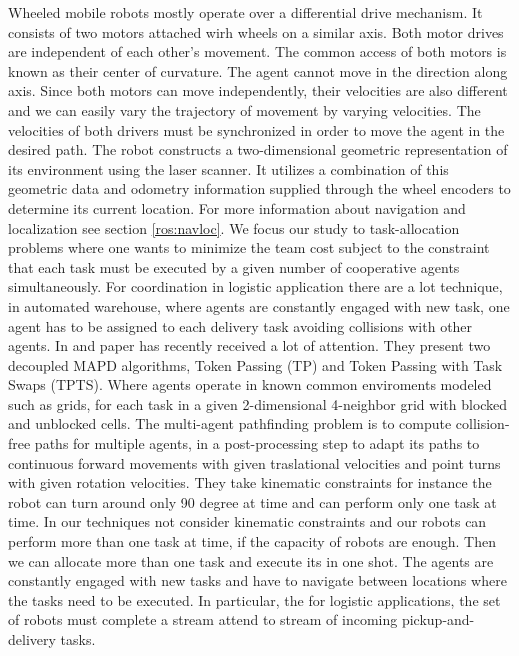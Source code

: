 Wheeled mobile robots mostly operate over a differential drive mechanism. It consists 
of two motors attached wirh wheels on a similar axis. Both motor drives are independent 
of each other's movement. The common access of both motors is known as their center of curvature.
The agent cannot move in the direction along axis. Since both motors can move independently,
their velocities are also different and we can easily vary the trajectory of movement by varying
velocities. The velocities of both drivers must be synchronized in order to move 
the agent in the desired path. 
The robot constructs a two-dimensional geometric representation of its environment
using the laser scanner. It utilizes a combination of this geometric data and odometry
information supplied through the wheel encoders to determine its current location.
For more information about navigation and localization see section \ref{ros:navloc}.
We focus our study to task-allocation problems where one wants to minimize the team 
cost subject to the constraint that each task must be executed by a given number 
of cooperative agents simultaneously.
For \mrs coordination in logistic application there are a lot technique,
in automated warehouse, where agents are constantly engaged with new task, one agent
has to be assigned to each delivery task avoiding collisions with other agents. 
In \cite{mapd} and \cite{mapf} paper has recently received a lot of attention.
They present two decoupled MAPD algorithms, Token Passing (TP) and Token Passing with
Task Swaps (TPTS). Where agents operate in known common enviroments modeled such as 
grids, for each task in a given 2-dimensional 4-neighbor grid with blocked and unblocked 
cells. The multi-agent pathfinding problem is to compute collision-free paths for 
multiple agents, in a post-processing step to adapt its paths to continuous forward 
movements with given traslational velocities and point turns with given rotation velocities.
They take kinematic constraints for instance the robot can turn around only 90 degree at time
and can perform only one task at time. 
In our techniques not consider kinematic constraints and our robots can perform more than one task at time, 
if the capacity of robots are enough.
Then we can allocate more than one task and execute its in one shot.
The agents are constantly engaged with new tasks and have
to navigate between locations where the tasks need to be executed. In particular,
the \mrs for logistic applications, the set of robots must complete a stream attend 
to stream of incoming pickup-and-delivery tasks.
 
